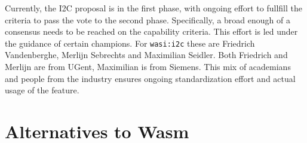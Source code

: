 Currently, the \gls{I2C} proposal is in the first phase, with ongoing effort to fullfill the criteria to pass the vote to the second phase. Specifically, a broad enough of a consensus needs to be reached on the capability criteria. This effort is led under the guidance of certain champions. For \texttt{wasi:i2c} these are Friedrich Vandenberghe, Merlijn Sebrechts and Maximilian Seidler. Both Friedrich and Merlijn are from UGent, Maximilian is from Siemens. This mix of academians and people from the industry ensures ongoing standardization effort and actual usage of the feature.

\section{Alternatives to Wasm}

